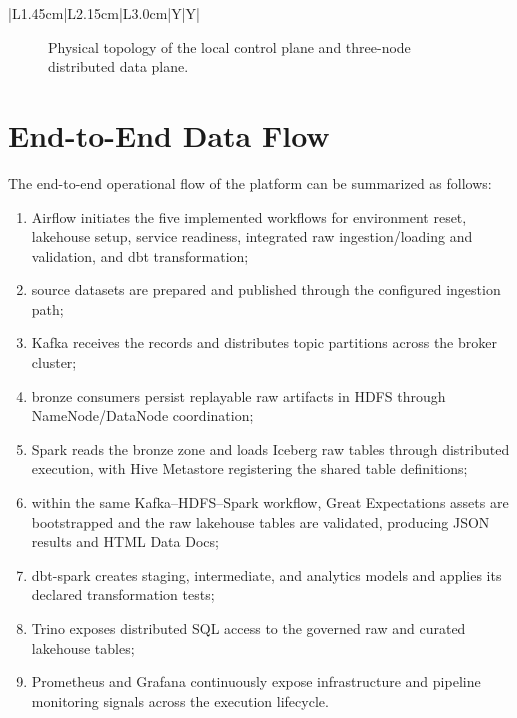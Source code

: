 \begin{table}[!htbp]
\begin{tabularx}{\textwidth}{|L{1.45cm}|L{2.15cm}|L{3.0cm}|Y|Y|}
        \hline
    \end{tabularx}
    \caption{Physical node distribution of the final deployment}
    \label{tab:chapter4-nodes}
\end{table}
\FloatBarrier

\begin{figure}[H]
    \centering
    
    \caption{Physical topology of the local control plane and three-node distributed data plane.}
    \label{fig:chapter4-physical-architecture}
\end{figure}

\section{End-to-End Data Flow}
The end-to-end operational flow of the platform can be summarized as follows:
\begin{enumerate}
    \item Airflow initiates the five implemented workflows for environment reset, lakehouse setup, service readiness, integrated raw ingestion/loading and validation, and dbt transformation;
    \item source datasets are prepared and published through the configured ingestion path;
    \item Kafka receives the records and distributes topic partitions across the broker cluster;
    \item bronze consumers persist replayable raw artifacts in HDFS through NameNode/DataNode coordination;
    \item Spark reads the bronze zone and loads Iceberg raw tables through distributed execution, with Hive Metastore registering the shared table definitions;
    \item within the same Kafka--HDFS--Spark workflow, Great Expectations assets are bootstrapped and the raw lakehouse tables are validated, producing JSON results and HTML Data Docs;
    \item dbt-spark creates staging, intermediate, and analytics models and applies its declared transformation tests;
    \item Trino exposes distributed SQL access to the governed raw and curated lakehouse tables;
    \item Prometheus and Grafana continuously expose infrastructure and pipeline monitoring signals across the execution lifecycle.
\end{enumerate}

